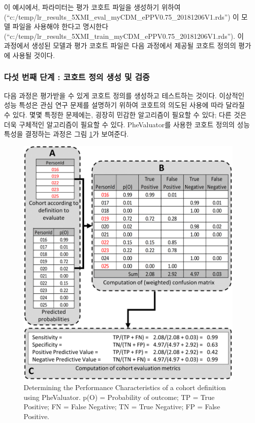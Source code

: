 \documentclass[10.5pt]{book}
\theoremstyle{definition}
\theoremstyle{definition}
\theoremstyle{definition}
\theoremstyle{remark}
\begin{document}
이 예시에서, 파라미터는 평가 코호트 파일을 생성하기 위하여
(``c:/temp/lr\_results\_5XMI\_eval\_myCDM\_ePPV0.75\_20181206V1.rds'')
이 모델 파일을 사용해야 한다고 명시한다
(``c:/temp/lr\_results\_5XMI\_train\_myCDM\_ePPV0.75\_20181206V1.rds'').
이 과정에서 생성된 모델과 평가 코호트 파일은 다음 과정에서 제공될 코호트
정의의 평가에 사용될 것이다.

\subsubsection*{다섯 번째 단계 : 코호트 정의 생성 및
검증}\label{-------}

다음 과정은 평가받을 수 있게 코호트 정의를 생성하고 테스트하는 것이다.
이상적인 성능 특성은 관심 연구 문제를 설명하기 위하여 코호트의 의도된
사용에 따라 달라질 수 있다. 몇몇 특정한 문제에는, 굉장히 민감한
알고리즘이 필요할 수 있다; 다른 것은 더욱 구체적인 알고리즘이 필요할 수
있다. PheValuator를 사용한 코호트 정의의 성능 특성을 결정하는 과정은
그림 \ref{fig:phevaluatorDiagram}가 보여준다.

\begin{figure}

{\centering \includegraphics[width=1\linewidth]{images/ClinicalValidity/PheValuatorEvaluation} 

}

\caption{Determining the Performance Characteristics of a cohort definition using PheValuator. p(O) = Probability of outcome; TP = True Positive; FN = False Negative; TN = True Negative; FP = False Positive.}\label{fig:phevaluatorDiagram}
\end{figure}
\end{document}
